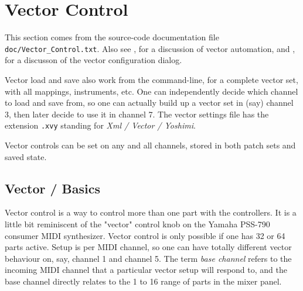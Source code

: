 %
%
%

\section{Vector Control}
\label{sec:vector}

   This section comes from the source-code documentation file
   \texttt{doc/Vector\_Control.txt}.
   Also see 
   , for a discussion
   of vector automation, and
   , for a discusson of the vector
   configuration dialog.

   Vector load and save also work from the command-line, for a complete vector
   set, with all mappings, instruments, etc.
   One can independently decide which
   channel to load and save from, so one can actually build up a vector set in
   (say) channel 3, then later decide to use it in channel 7.
   The vector settings file
   has the extension \texttt{.xvy} standing for 
   \textsl{Xml / Vector / Yoshimi}.

   Vector controls can be set on any and all channels,
   stored in both patch sets and saved state.

\subsection{Vector / Basics}
\label{subsection:vector_basics}

   Vector control is a way to control more than one part with the controllers.
   It is a little bit reminiscent of the "vector" control knob on the Yamaha
   PSS-790 consumer MIDI synthesizer.  Vector control is only possible if one
   has 32 or 64 parts active.  Setup is per MIDI channel, so one can have
   totally different vector behaviour on, say, channel 1 and channel 5.
    The term \textsl{base channel} refers to the
   incoming MIDI channel that a particular vector setup will respond to, and
   the base channel directly relates to the 1 to 16 range of parts in the mixer
   panel.

